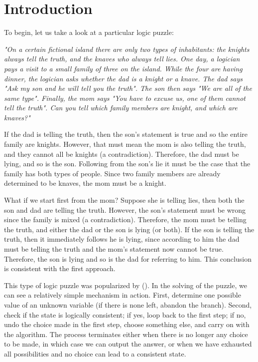 \section{Introduction}

To begin, let us take a look at a particular logic puzzle:

{\small\textit{"On a certain fictional island there are only two types of inhabitants: the knights always tell the truth, and the knaves who always tell lies. One day, a logician pays a visit to a small family of three on the island. While the four are having dinner, the logician asks whether the dad is a knight or a knave. The dad says "Ask my son and he will tell you the truth". The son then says "We are all of the same type". Finally, the mom says "You have to excuse us, one of them cannot tell the truth". Can you tell which family members are knight, and which are knaves?"}}

If the dad is telling the truth, then the son's statement is true and so the entire family are knights. However, that must mean the mom is also telling the truth, and they cannot all be knights (a contradiction). Therefore, the dad must be lying, and so is the son. Following from the son's lie it must be the case that the family has both types of people. Since two family members are already determined to be knaves, the mom must be a knight.

What if we start first from the mom? Suppose she is telling lies, then both the son and dad are telling the truth. However, the son's statement must be wrong since the family is mixed (a contradiction). Therefore, the mom must be telling the truth, and either the dad or the son is lying (or both). If the son is telling the truth, then it immediately follows he is lying, since according to him the dad must be telling the truth and the mom's statement now cannot be true. Therefore, the son is lying and so is the dad for referring to him. This conclusion is consistent with the first approach.

This type of logic puzzle was popularized by (\cite{knight}). In the solving of the puzzle, we can see a relatively simple mechanism in action. First, determine one possible value of an unknown variable (if there is none left, abandon the branch). Second, check if the state is logically consistent; if yes, loop back to the first step; if no, undo the choice made in the first step, choose something else, and carry on with the algorithm. The process terminates either when there is no longer any choice to be made, in which case we can output the answer, or when we have exhausted all possibilities and no choice can lead to a consistent state.


